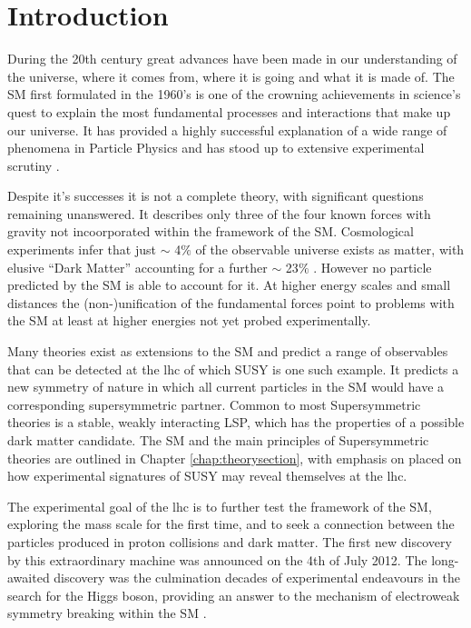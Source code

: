 \chapter{Introduction}
\label{chap:introduction}

During the 20th century great advances have been made in our understanding of the universe, where it comes from, where it is going and what it is made of. The \acf{SM} first formulated in the 1960's is one of the crowning achievements in science's quest to explain the most fundamental processes and interactions that make up our universe. It has provided a highly successful explanation of a wide range of phenomena in Particle Physics and has stood up to extensive experimental scrutiny \cite{pdg2012}.

Despite it's successes it is not  a complete theory, with significant questions remaining unanswered. It describes only three of the four known forces with gravity not incoorporated within the framework of the \ac{SM}. Cosmological experiments infer that just $\sim$ 4$\%$ of the observable universe exists as matter, with elusive ``Dark Matter'' accounting for a further $\sim$ 23$\%$ \cite{0067-0049-208-2-19}. However no particle predicted by the \ac{SM} is able to account for it.  At higher energy scales and small distances the (non-)unification of the fundamental forces point to problems with the \ac{SM} at least at higher energies not yet probed experimentally. 

Many theories exist as extensions to the \ac{SM} and predict a range of observables that can be detected at the \acf{lhc} of which \acf{SUSY} is one such example. It predicts a new symmetry of nature in which all current particles in the \ac{SM} would have a corresponding supersymmetric partner. Common to most Supersymmetric theories is a stable, weakly interacting \acf{LSP}, which has the properties of a possible dark matter candidate. The \ac{SM} and the main principles of Supersymmetric theories are outlined in Chapter \ref{chap:theorysection}, with emphasis on placed on how experimental signatures of \ac{SUSY} may reveal themselves at the \ac{lhc}.

The experimental goal of the \ac{lhc} is to further test the framework of the \ac{SM}, exploring the \TeV mass scale for the first time, and to seek a connection between the particles produced in proton collisions and dark matter. The first new discovery by this extraordinary machine was announced on the 4th of July 2012. The long-awaited discovery was the culmination decades of experimental endeavours in the search for the Higgs boson, providing an answer to the mechanism of electroweak symmetry breaking within the \ac{SM} \cite{Aad:2012tfa}\cite{Chatrchyan:2012ufa}. 

